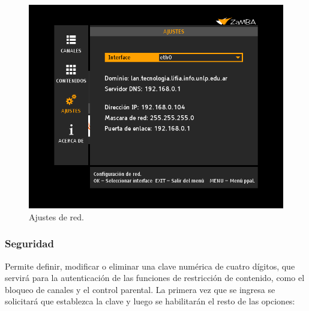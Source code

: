 \documentclass{article}
\begin{document}
	\begin{figure}[h]
		\centerline{\includegraphics[scale=0.50,keepaspectratio=true]{ajustes_red}}
		\caption{Ajustes de red.}
	\end{figure}

\subsubsection{Seguridad}
	Permite definir, modificar o eliminar una clave numérica de cuatro dígitos, que servirá para la autenticación de las funciones de restricción de contenido, como el bloqueo de canales y el control parental.
	La primera vez que se ingresa se solicitará que establezca la clave y luego se habilitarán el resto de las opciones:
	
\end{document}
